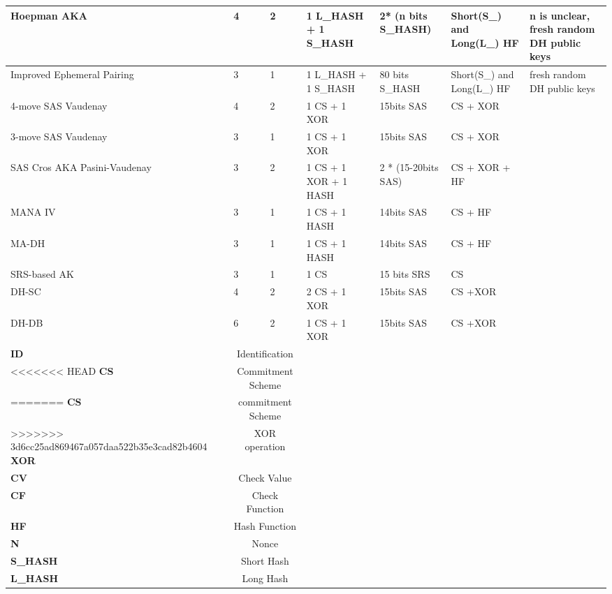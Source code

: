 \begin{table}[ht]
{\begin{tabular}{ | p{2cm} | p{1.4cm} | p{1.4cm} | p{2cm} | p{2.2cm} | p{2cm} | p{2cm}| }
Hoepman AKA & 4	& 2 &	 1 L\_HASH + 1 S\_HASH & 	2* (n bits S\_HASH) &	 Short(S\_) and Long(L\_) HF & n is unclear, fresh random DH public keys \\ \hline 

Improved	Ephemeral Pairing & 3 &	 1 &	 1 L\_HASH + 1 S\_HASH &	80 bits S\_HASH & Short(S\_) and Long(L\_) HF & fresh random DH public keys \\ \hline 
 
4-move SAS Vaudenay & 4	& 2 & 1 CS + 1 XOR & 15bits SAS	& CS + XOR & \\ \hline 

3-move SAS Vaudenay & 3	& 1 & 1 CS + 1 XOR & 15bits SAS	& CS + XOR & \\ \hline 
 																				
SAS Cros AKA Pasini-Vaudenay &	3 &	2 &	1 CS + 1 XOR + 1 HASH & 2 * (15-20bits SAS) & CS + XOR + HF & \\ \hline 

MANA IV & 3 & 1 & 1 CS + 1 HASH & 14bits SAS & CS + HF & \\ \hline 

MA-DH & 3 &	1 &	1 CS + 1 HASH & 14bits SAS & CS + HF & \\ \hline 

 SRS-based AK & 3 & 1 &	1 CS &	 15 bits SRS &	 CS & \\ \hline 

DH-SC & 4 &	2 &	2 CS + 1 XOR & 15bits SAS & CS +XOR & \\ \hline 

DH-DB & 6 &	2 &	1 CS + 1 XOR & 15bits SAS & CS +XOR & \\ \hline \hline 

\textbf{ID} &\multicolumn{2}{c}{Identification} & & & & \\
<<<<<<< HEAD
\textbf{CS} &\multicolumn{2}{c}{Commitment Scheme} & & & & \\
=======
\textbf{CS} &\multicolumn{2}{c}{commitment Scheme} & & & & \\
>>>>>>> 3d6cc25ad869467a057daa522b35e3cad82b4604
\textbf{XOR} &\multicolumn{2}{c}{XOR operation} & & & & \\
\textbf{CV} &\multicolumn{2}{c}{Check Value} & & & & \\
\textbf{CF} &\multicolumn{2}{c}{Check Function} & & & & \\
\textbf{HF} &\multicolumn{2}{c}{Hash Function} & & & & \\
\textbf{N} &\multicolumn{2}{c}{Nonce} & & & & \\
\textbf{S\_HASH} &\multicolumn{2}{c}{Short Hash} & & & & \\
\textbf{L\_HASH} &\multicolumn{2}{c}{Long Hash} & & & & \\ \hline
\end{tabular}
}
\end{table}

